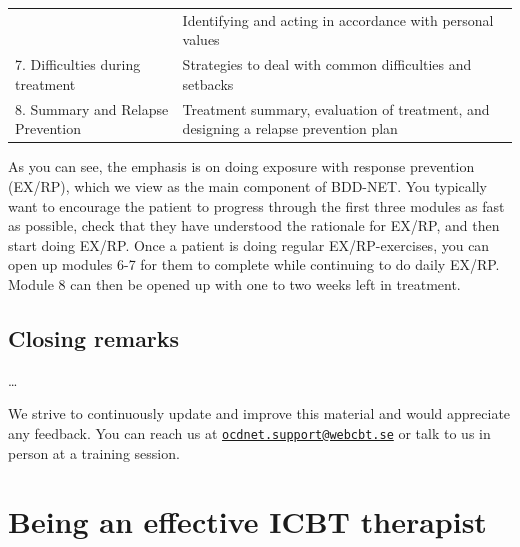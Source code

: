 \documentclass[]{book}
\theoremstyle{definition}
\theoremstyle{definition}
\theoremstyle{definition}
\theoremstyle{remark}
\begin{document}
\begin{longtable}[]{@{}ll@{}}
\begin{minipage}[t]{0.47\columnwidth}
\end{minipage} & \begin{minipage}[t]{0.47\columnwidth}\raggedright
Identifying and acting in accordance with personal values\strut
\end{minipage}\tabularnewline
\begin{minipage}[t]{0.47\columnwidth}\raggedright
7. Difficulties during treatment\strut
\end{minipage} & \begin{minipage}[t]{0.47\columnwidth}\raggedright
Strategies to deal with common difficulties and setbacks\strut
\end{minipage}\tabularnewline
\begin{minipage}[t]{0.47\columnwidth}\raggedright
8. Summary and Relapse Prevention\strut
\end{minipage} & \begin{minipage}[t]{0.47\columnwidth}\raggedright
Treatment summary, evaluation of treatment, and designing a relapse
prevention plan\strut
\end{minipage}\tabularnewline
\bottomrule
\end{longtable}

As you can see, the emphasis is on doing exposure with response
prevention (EX/RP), which we view as the main component of BDD-NET. You
typically want to encourage the patient to progress through the first
three modules as fast as possible, check that they have understood the
rationale for EX/RP, and then start doing EX/RP. Once a patient is doing
regular EX/RP-exercises, you can open up modules 6-7 for them to
complete while continuing to do daily EX/RP. Module 8 can then be opened
up with one to two weeks left in treatment.

\hypertarget{closing-remarks-1}{%
\section{Closing remarks}\label{closing-remarks-1}}

\ldots{}

We strive to continuously update and improve this material and would
appreciate any feedback. You can reach us at
\href{mailto:ocdnet.support@webcbt.se}{\nolinkurl{ocdnet.support@webcbt.se}}
or talk to us in person at a training session.

\hypertarget{being-an-effective-icbt-therapist}{%
\chapter{Being an effective ICBT
therapist}\label{being-an-effective-icbt-therapist}}
\end{document}
